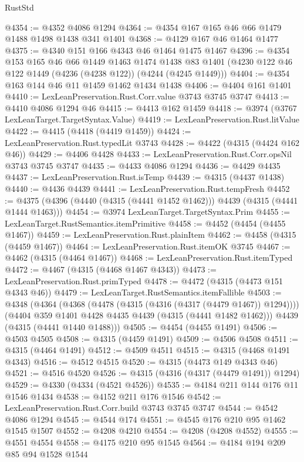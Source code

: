 \begin{lexlean}{RustStd}
\begin{coremodule}
@4354 := @4352 @4086 @1294
@4364 := @4354 @167 @165 @46 @66 @1479 @1488 @1498 @1438 @341 @1401
@4368 := @4129 @167 @46 @1464 @1477
@4375 := @4340 @151 @166 @4343 @46 @1464 @1475 @1467
@4396 := @4354
    @153
    @165
    @46
    @66
    @1449
    @1463
    @1474
    @1438
    @83
    @1401
    (@4230 @122 @46 @122 @1449 (@4236 (@4238 @122)) (@4244 (@4245 @1449)))
@4404 := @4354 @163 @144 @46 @11 @1459 @1462 @1434 @1438
@4406 := @4404 @161 @1401
@4410 := LexLeanPreservation.Rust.Corr.value @3743 @3745 @3747
@4413 := @4410 @4086 @1294 @46
@4415 := @4413 @162 @1459
@4418 := @3974 (@3767 LexLeanTarget.TargetSyntax.Value)
@4419 := LexLeanPreservation.Rust.litValue
@4422 := @4415 (@4418 (@4419 @1459))
@4424 := LexLeanPreservation.Rust.typedLit @3743
@4428 := @4422 (@4315 (@4424 @162 @46))
@4429 := @4406 @4428
@4433 := LexLeanPreservation.Rust.Corr.opsNil @3743 @3745 @3747
@4435 := @4433 @4086 @1294
@4436 := @4429 @4435
@4437 := LexLeanPreservation.Rust.isTemp
@4439 := @4315 (@4437 @1438)
@4440 := @4436 @4439
@4441 := LexLeanPreservation.Rust.tempFresh
@4452 := @4375 (@4396 (@4440 (@4315 (@4441 @1452 @1462))) @4439 (@4315 (@4441 @1444 @1463)))
@4454 := @3974 LexLeanTarget.TargetSyntax.Prim
@4455 := LexLeanTarget.RustSemantics.itemPrimitive
@4458 := @4452 (@4454 (@4455 @1467))
@4459 := LexLeanPreservation.Rust.plainItem
@4462 := @4458 (@4315 (@4459 @1467))
@4464 := LexLeanPreservation.Rust.itemOK @3745
@4467 := @4462 (@4315 (@4464 @1467))
@4468 := LexLeanPreservation.Rust.itemTyped
@4472 := @4467 (@4315 (@4468 @1467 @4343))
@4473 := LexLeanPreservation.Rust.primTyped
@4478 := @4472 (@4315 (@4473 @151 @4343 @46))
@4479 := LexLeanTarget.RustSemantics.itemFallible
@4503 := @4348
    (@4364
      (@4368 (@4478 (@4315 (@4316 (@4317 (@4479 @1467)) @1294))))
      (@4404 @359 @1401 @4428 @4435 @4439 (@4315 (@4441 @1482 @1462)))
      @4439
      (@4315 (@4441 @1440 @1488)))
@4505 := @4454 (@4455 @1491)
@4506 := @4503 @4505
@4508 := @4315 (@4459 @1491)
@4509 := @4506 @4508
@4511 := @4315 (@4464 @1491)
@4512 := @4509 @4511
@4515 := @4315 (@4468 @1491 @4343)
@4516 := @4512 @4515
@4520 := @4315 (@4473 @149 @4343 @46)
@4521 := @4516 @4520
@4526 := @4315 (@4316 (@4317 (@4479 @1491)) @1294)
@4529 := @4330 (@4334 (@4521 @4526))
@4535 := @4184 @211 @144 @176 @11 @1546 @1434
@4538 := @4152 @211 @176 @1546
@4542 := LexLeanPreservation.Rust.Corr.build @3743 @3745 @3747
@4544 := @4542 @4086 @1294
@4545 := @4544 @174
@4551 := @4545 @176 @210 @95 @1462 @1545 @1507
@4552 := @4208 @4210
@4554 := @4208 (@4208 @4552)
@4555 := @4551 @4554
@4558 := @4175 @210 @95 @1545
@4564 := @4184 @194 @209 @85 @94 @1528 @1544

\end{coremodule}
\end{lexlean}
